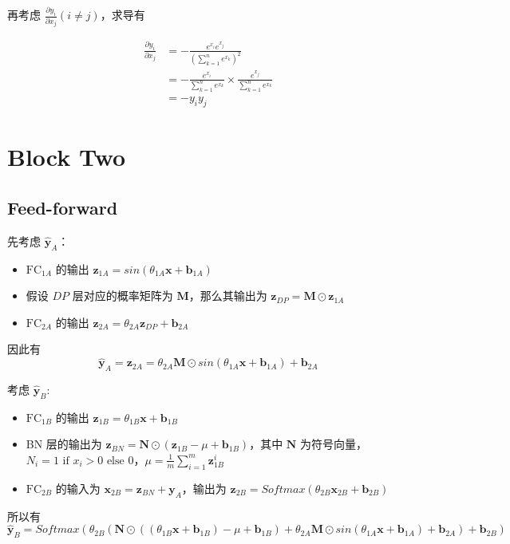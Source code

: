 \documentclass[lang=cn,11pt,a4paper,cite=authoryear]{elegantpaper}
\newcommand{\diff}[2]{\frac{\partial #1}{\partial #2}}
\newcommand{\hbf}[1]{\hat{\mathbf{#1}}}
\begin{document}
再考虑 $\diff{y_i}{x_j}(i\neq j)$，求导有 

$$
\begin{aligned}
  \diff{y_i}{x_j}&=-\frac{e^{x_i}e^{x_j}}{(\sum_{k=1}^n e^{x_k})^2}\\
  &= - \frac{e^{x_i}}{\sum_{k=1}^n e^{x_k}} \times \frac{e^{x_j}}{\sum_{k=1}^n e^{x_k}} \\ 
  &= -y_iy_j
\end{aligned}
$$


\section{Block Two}
\subsection{Feed-forward}
先考虑 $\hbf{y}_A$：
\begin{itemize}
  \item $\text{FC}_{1A}$ 的输出 $\mathbf{z}_{1A}=sin(\theta_{1A}\mathbf{x}+\mathbf{b}_{1A})$
  \item 假设 $DP$ 层对应的概率矩阵为 $\mathbf{M}$，那么其输出为 $\mathbf{z}_{DP}=\mathbf{M}\odot \mathbf{z}_{1A}$
  \item $\text{FC}_{2A}$ 的输出 $\mathbf{z}_{2A}=\theta_{2A}\mathbf{z}_{DP}+\mathbf{b}_{2A}$
\end{itemize}
因此有
$$\hbf{y}_A=\mathbf{z}_{2A}=\theta_{2A}\mathbf{M}\odot sin(\theta_{1A}\mathbf{x}+\mathbf{b}_{1A})+\mathbf{b}_{2A}$$

考虑 $\hbf{y}_B$:
\begin{itemize}
  \item $\text{FC}_{1B}$ 的输出 $\mathbf{z}_{1B}=\theta_{1B}\mathbf{x} + \mathbf{b}_{1B}$
  \item BN 层的输出为 $\mathbf{z}_{BN}=\mathbf{N}\odot (\mathbf{z}_{1B}-\mu+\mathbf{b}_{1B})$，其中 $\mathbf{N}$ 为符号向量，$N_i= 1 \text{ if } x_i > 0 \text{ else } 0$，$\mu = \frac{1}{m}\sum_{i=1}^m \mathbf{z}_{1B}^i$
  \item $\text{FC}_{2B}$ 的输入为 $\mathbf{x}_{2B}=\mathbf{z}_{BN}+\mathbf{y}_A$，输出为 $\mathbf{z}_{2B}=Softmax(\theta_{2B}\mathbf{x}_{2B}+\mathbf{b}_{2B})$
\end{itemize}
所以有 $\hbf{y}_B=Softmax\left (\theta_{2B}(\mathbf{N}\odot ((\theta_{1B}\mathbf{x} + \mathbf{b}_{1B})-\mu+\mathbf{b}_{1B})+\theta_{2A}\mathbf{M}\odot sin(\theta_{1A}\mathbf{x}+\mathbf{b}_{1A})+\mathbf{b}_{2A})+\mathbf{b}_{2B}\right )$
\end{document}
